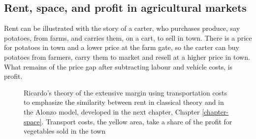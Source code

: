 






\subsection{Rent, space, and profit in agricultural markets}

Rent  can be illustrated with the story of a carter, who purchases produce, say potatoes, from farms, and carries them, on a cart, to sell in town.
There is a price for potatoes in town and a lower price at the farm gate, so the carter can buy potatoes from farmers, carry them to market and resell at a higher price in town. What remains of the price gap after subtracting labour and vehicle costs, is profit.  

\begin{figure}[htb]
    \begin{center}
    
    \caption[Ricardo's theory of extensive margin.]{Ricardo's theory of the extensive margin using transportation costs to emphasize the similarity between rent in classical theory and in the Alonzo model, developed in the next chapter, Chapter \ref{chapter-space}. Transport costs, the yellow area, take a share of the profit for vegetables sold in the town}
    \label{fig-rent-ricardo}
    \end{center}
\end{figure}

